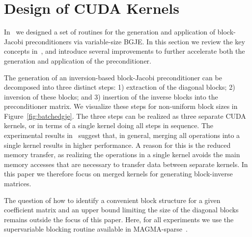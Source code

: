 \section{Design of CUDA Kernels}
\label{sec:s3-kernel}

In~\cite{Anzt:2017:BGE:3026937.3026940} we designed a set of routines
for the generation and application of block-Jacobi preconditioners
via variable-size BGJE.
In this section we review the key concepts in~\cite{Anzt:2017:BGE:3026937.3026940},
and introduce several improvements to further accelerate both the 
generation and application of the preconditioner.

The generation of an inversion-based block-Jacobi preconditioner can be 
decomposed into three distinct steps:
1) extraction of the diagonal blocks; 2) inversion of {these blocks};
and 3) insertion of the inverse blocks into the preconditioner matrix.
We visualize these steps for non-uniform block sizes in Figure~\ref{fig:batchedgje}.
The three steps can be realized as three separate CUDA kernels,
or in terms of a single kernel doing all steps in sequence.
The experimental results in~\cite{Anzt:2017:BGE:3026937.3026940}
suggest that, in general,
merging all operations into a single kernel results in higher performance.
A reason for this is the reduced memory transfer,
as realizing the operations in a single kernel avoids the main memory accesses that 
are necessary to transfer data {between separate kernels}.
In this paper we therefore focus on merged kernels for generating block-inverse matrices.

The question of how to identify a convenient block structure for a given 
coefficient matrix and an upper bound limiting the size of the diagonal blocks remains 
outside the focus of this paper.
Here, for all experiments we use the supervariable blocking routine
available in MAGMA-sparse~\cite{magma}.


